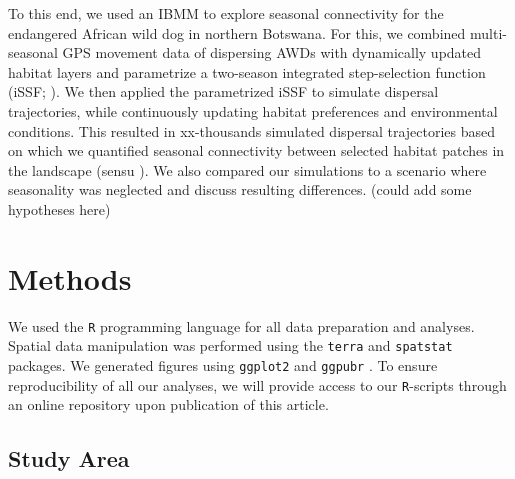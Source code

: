 \documentclass[abstract=on,10pt,a4paper,bibliography=totocnumbered]{article}
\begin{document}
To this end, we used an IBMM to explore seasonal connectivity for the endangered
African wild dog in northern Botswana. For this, we combined multi-seasonal GPS
movement data of dispersing AWDs with dynamically updated habitat layers and
parametrize a two-season integrated step-selection function (iSSF;
\citealp{Avgar.2016}). We then applied the parametrized iSSF to simulate
dispersal trajectories, while continuously updating habitat preferences and
environmental conditions. This resulted in xx-thousands simulated dispersal
trajectories based on which we quantified seasonal connectivity between selected
habitat patches in the landscape (sensu \citealp{Hofmann.2023}). We also
compared our simulations to a scenario where seasonality was neglected and
discuss resulting differences. (could add some hypotheses here)

\section{Methods}

We used the \texttt{R} programming language \citep{RCoreTeam.2023} for all data
preparation and analyses. Spatial data manipulation was performed using the
\texttt{terra} \citep{Hijmans.2023} and \texttt{spatstat} \citep{Baddeley.2015}
packages. We generated figures using \texttt{ggplot2} \citep{Wickham.2023} and
\texttt{ggpubr} \citep{Kassambara.2023}. To ensure reproducibility of all our
analyses, we will provide access to our \texttt{R}-scripts through an online
repository upon publication of this article.

\subsection{Study Area}
\end{document}
